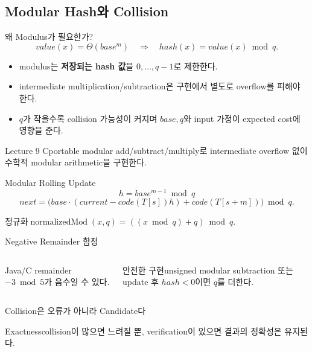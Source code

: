 \subsection{Modular Hash와 Collision}
\begin{frame}{왜 Modulus가 필요한가?}
\[
value(x)=\Theta(base^m)\quad\Rightarrow\quad hash(x)=value(x)\bmod q.
\]
\begin{itemize}
\item modulus는 \textbf{저장되는 hash 값}을 \(0,\ldots,q-1\)로 제한한다.
\item intermediate multiplication/subtraction은 구현에서 별도로 overflow를 피해야 한다.
\item \(q\)가 작을수록 collision 가능성이 커지며 \(base,q\)와 input 가정이 expected cost에 영향을 준다.
\end{itemize}
\begin{block}{Lecture 9 C}portable modular add/subtract/multiply로 intermediate overflow 없이 수학적 modular arithmetic을 구현한다.\end{block}
\end{frame}
\begin{frame}{Modular Rolling Update}
\[
h=base^{m-1}\bmod q
\]
\[
next=\bigl(base\cdot(current-code(T[s])h)+code(T[s+m])\bigr)\bmod q.
\]
\begin{block}{정규화}\(\operatorname{normalizedMod}(x,q)=((x\bmod q)+q)\bmod q\).\end{block}
\end{frame}
\begin{frame}{Negative Remainder 함정}
\begin{columns}[T]
\begin{alertblock}{Java/C remainder}\(-3\bmod 5\)가 음수일 수 있다.\end{alertblock}
\begin{block}{안전한 구현}unsigned modular subtraction 또는 update 후 \(hash<0\)이면 \(q\)를 더한다.\end{block}
\end{columns}
\end{frame}
\begin{frame}{Collision은 오류가 아니라 Candidate다}
\centering{}
\begin{block}{Exactness}collision이 많으면 느려질 뿐, verification이 있으면 결과의 정확성은 유지된다.\end{block}
\end{frame}
